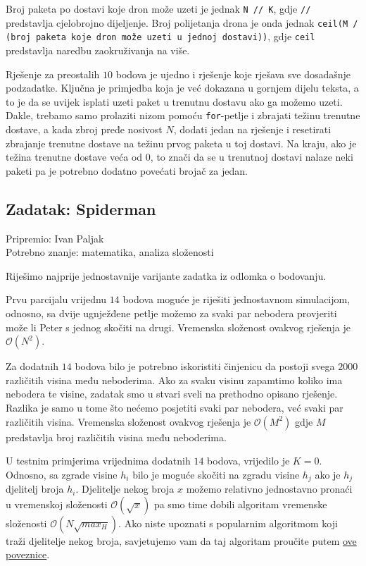 \documentclass[a4paper]{article}
\begin{document}
Broj paketa po dostavi koje dron može uzeti je jednak \texttt{N // K}, gdje
\texttt{//} predstavlja cjelobrojno dijeljenje. Broj polijetanja drona je onda
jednak \texttt{ceil(M / (broj paketa koje dron može uzeti u jednoj dostavi))},
gdje \texttt{ceil} predstavlja naredbu zaokruživanja na više.

Rješenje za preostalih $10$ bodova je ujedno i rješenje koje rješava sve
dosadašnje podzadatke. Ključna je primjedba koja je već dokazana u gornjem
dijelu teksta, a to je da se uvijek isplati uzeti paket u trenutnu dostavu ako
ga možemo uzeti. Dakle, trebamo samo prolaziti nizom pomoću \texttt{for}-petlje
i zbrajati težinu trenutne dostave, a kada zbroj pređe nosivost $N$, dodati
jedan na rješenje i resetirati zbrajanje trenutne dostave na težinu prvog
paketa u toj dostavi. Na kraju, ako je težina trenutne dostave veća od $0$, to
znači da se u trenutnoj dostavi nalaze neki paketi pa je potrebno dodatno
povećati brojač za jedan.

\subsection*{Zadatak: Spiderman}
\textsf{Pripremio: Ivan Paljak}\\
\textsf{Potrebno znanje: matematika, analiza složenosti}

Riješimo najprije jednostavnije varijante zadatka iz odlomka o bodovanju.

Prvu parcijalu vrijednu $14$ bodova moguće je riješiti jednostavnom simulacijom,
odnosno, sa dvije ugnježđene petlje možemo za svaki par nebodera provjeriti
može li Peter s jednog skočiti na drugi. Vremenska složenost ovakvog rješenja
je $\mathcal{O}(N^2)$.

Za dodatnih $14$ bodova bilo je potrebno iskoristiti činjenicu da postoji svega
$2000$ različitih visina među neboderima. Ako za svaku visinu zapamtimo koliko
ima nebodera te visine, zadatak smo u stvari sveli na prethodno opisano
rješenje.  Razlika je samo u tome što nećemo posjetiti svaki par nebodera, već
svaki par različitih visina. Vremenska složenost ovakvog rješenja je
$\mathcal{O}(M^2)$ gdje $M$ predstavlja broj različitih visina među neboderima.

U testnim primjerima vrijednima dodatnih $14$ bodova, vrijedilo je $K = 0$.
Odnosno, sa zgrade visine $h_i$ bilo je moguće skočiti na zgradu visine $h_j$
ako je $h_j$ djelitelj broja $h_i$. Djelitelje nekog broja $x$ možemo relativno
jednostavno pronaći u vremenskoj složenosti $\mathcal{O}(\sqrt{x})$ pa smo time
dobili algoritam vremenske složenosti $\mathcal{O}(N\sqrt{max_H})$. Ako niste
upoznati s popularnim algoritmom koji traži djelitelje nekog broja, savjetujemo
vam da taj algoritam proučite putem
\href{https://www.math.uh.edu/~minru/web/divis2.html}{ove poveznice}.
\end{document}
